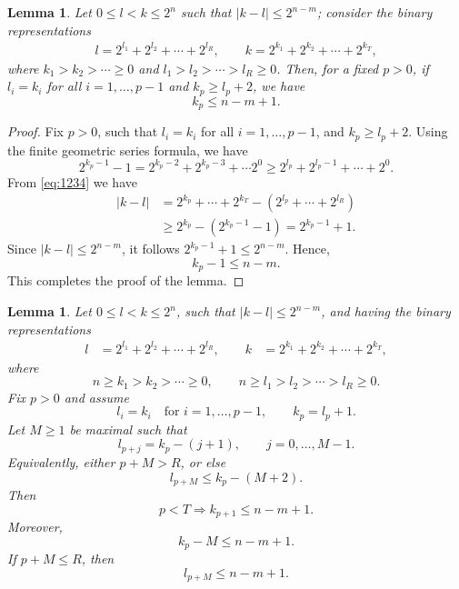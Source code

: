 \documentclass[11pt]{amsart}
\newtheorem{lemma}[theorem]{Lemma}
\theoremstyle{definition}
\renewcommand{\1}{{\mathbbm{1}}}
\begin{document}
\begin{lemma}\label{claim0}
Let $0 \leq l < k \leq 2^n$ such that $|k - l| \leq 2^{n-m}$; consider the binary representations
\begin{align*}
    l=2^{l_1} + 2^{l_2} +\cdots +2^{l_R},\qquad 
    k=2^{k_1} + 2^{k_2} +\cdots +2^{k_T},
\end{align*}
where $k_1 > k_2 > \cdots \geq 0$ and $l_1>l_2>\cdots >l_R\geq 0$.
Then, for a fixed $p>0$, if $l_i = k_i$ for all $i = 1, \dots, p-1$ and $k_p \geq l_p + 2$, we have 
\[
k_p \leq n - m + 1.
\]
\end{lemma}
\begin{proof}
Fix $p>0$, such that $l_i=k_i$ for all $i=1, \ldots, p-1$, and $k_p\geq l_p+2$.
Using the finite geometric series formula, we have
\begin{equation}\label{eq:1234}
    2^{k_p-1}-1 = 2^{k_p-2} +2^{k_p-3}+\cdots 2^{0}\geq 2^{l_p}+2^{l_p-1}+\cdots+2^{0}.
\end{equation}
From \eqref{eq:1234} we have 
\begin{align*}
    |k-l|&=2^{k_p}+\cdots+ 2^{k_T} - (2^{l_p} +\cdots +2^{l_R})\\
    &\geq 2^{k_p} - (2^{k_p-1}-1)= 2^{k_p-1}+1.
\end{align*}
 Since $|k-l|\leq 2^{n-m}$, it follows  $2^{k_p-1}+1 \leq 2^{n-m}$. Hence,
 \[
 k_p-1\leq n-m.
 \]
 This completes the proof of the lemma.
\end{proof}



\begin{lemma}\label{obs2}
Let $0 \leq l < k \leq 2^n$, such that $|k - l| \leq 2^{n-m}$, and having the binary representations
\begin{align*}
    l&=2^{l_1} + 2^{l_2} +\cdots +2^{l_R},\qquad 
    k&=2^{k_1} + 2^{k_2} +\cdots +2^{k_T}, 
\end{align*}
where
\[
n\geq k_1 > k_2 > \cdots \geq 0,
\qquad
n\geq l_1>l_2>\cdots >l_R\geq 0.
\]
Fix $p>0$ and assume
\[
l_i = k_i \quad\text{for } i=1,\dots,p-1,
\qquad
k_p = l_p + 1.
\]
Let $M\ge 1$ be maximal such that
\[
l_{p+j}=k_p-(j+1),\qquad j=0,\dots,M-1.
\]
Equivalently, either $p+M>R$, or else
\[
l_{p+M}\le k_p-(M+2).
\]
Then
\begin{equation}\label{eq1}
p<T \Longrightarrow k_{p+1}\le n-m+1.
\end{equation}
Moreover,
\begin{equation}\label{eq2}
k_p-M\le n-m+1.
\end{equation}
If $p+M\le R$, then
\begin{equation}\label{eq3}
l_{p+M}\le n-m+1.
\end{equation}
\end{lemma}
\end{document}
